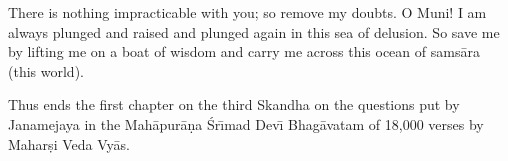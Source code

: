 There is nothing impracticable with you; so remove my doubts. O Muni! I am always plunged and raised and plunged again in this sea of delusion. So save me by lifting me on a boat of wisdom and carry me across this ocean of sams\=ara (this world).

Thus ends the first chapter on the third Skandha on the questions put by Janamejaya in the Mah\=apur\=a\d{n}a \'Sr\={\i}mad Dev\={\i} Bhag\=avatam of 18,000 verses by Mahar\d{s}i Veda Vy\=as.



